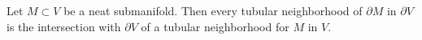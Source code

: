 Let $M \subset V$ be a neat submanifold. Then every tubular neighborhood of $\partial M$ in $\partial V$ is the intersection with $\partial V$ of a tubular neighborhood for $M$ in $V$.
